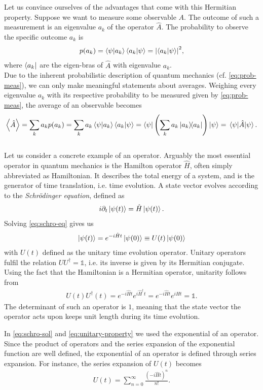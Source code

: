 Let us convince ourselves of the advantages that come with this Hermitian property.
Suppose we want to measure some observable $A$.
The outcome of such a measurement is an eigenvalue $a_k$ of the operator $\hat{A}$. The probability to observe the specific outcome $a_k$ is
\begin{align}\label{eq:prob-meas}
    p(a_k) = \braket{\psi}{a_k}\braket{a_k}{\psi} = \abs{\braket{a_k}{\psi}}^2,
\end{align}
where $\bra{a_k}$ are the eigen-bras of $\hat{A}$ with eigenvalue $a_k$.\\
Due to the inherent probabilistic description of quantum mechanics (cf. \cref{eq:prob-meas}), we can only make meaningful statements about averages.
Weighing every eigenvalue $a_k$ with its respective probability to be measured
given by \cref{eq:prob-meas}, the average of an observable becomes
\cite{nielsenQuantumComputationQuantum2010}
\begin{align}
    \expval{\hat{A}} = \sum\limits_k a_k p(a_k) = \sum\limits_k a_k \braket{\psi}{a_k}\braket{a_k}{\psi}
    = \bra{\psi} \left(\sum\limits_k a_k \dyad{a_k}\right) \ket{\psi} = \ev{\hat{A}}{\psi}.
\end{align}\\
Let us consider a concrete example of an operator.
Arguably the most essential operator in quantum mechanics is the Hamilton operator $\hat{H}$, often simply abbreviated as Hamiltonian.
It describes the total energy of a system, and is the generator of time translation, i.e. time evolution. A state vector evolves
according to the \emph{Schrödinger equation}, defined as
\cite{messiahQuantumMechanics1991}
\begin{align}\label{eq:schro-eq}
    i\partial_t \ket{\psi(t)} = \hat{H} \ket{\psi(t)}.
\end{align}
Solving \cref{eq:schro-eq} gives us
\begin{align}\label{eq:schro-sol}
    \ket{\psi(t)} = e^{-i\hat{H}t}\ket{\psi(0)} \equiv U(t)\ket{\psi(0)}
\end{align}
with $U(t)$ defined as the unitary time evolution operator. Unitary operators fulfil the relation $UU^\dagger=\mathds{1}$, i.e.
its inverse is given by its Hermitian conjugate. Using the fact that the Hamiltonian is a Hermitian operator, unitarity follows from 
\begin{align}\label{eq:unitary-property}
    U(t)U^\dagger(t) = e^{-i\hat{H}t}e^{i\hat{H}^\dagger t} = e^{-i\hat{H}t}e^{i\hat{H}t} = \mathds{1}.
\end{align}
The determinant of such an operator is $1$, meaning that
the state vector the operator acts upon keeps unit length during its time evolution.
\par
In \cref{eq:schro-sol} and \cref{eq:unitary-property} we used the exponential of an operator. Since the
product of operators and
the series expansion of the exponential function are well defined, the exponential of an operator is defined through series expansion.
For instance, the series expansion of $U(t)$ becomes
\begin{align}\label{eq:matrix-exp}
    U(t) = \sum\limits_{n=0}^\infty \frac{(-i\hat{H}t)^n}{n!}.
\end{align}

